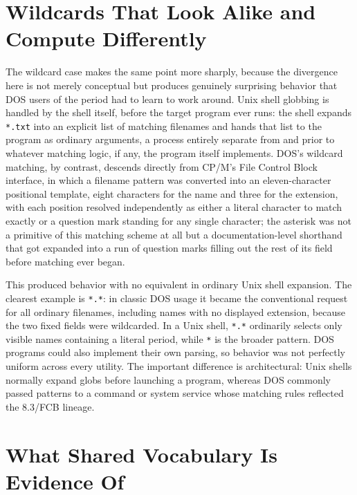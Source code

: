 \documentclass[11pt]{book}
\begin{document}
\section{Wildcards That Look Alike and Compute Differently}

The wildcard case makes the same point more sharply, because the divergence here is not merely conceptual but produces genuinely surprising behavior that DOS users of the period had to learn to work around. Unix shell globbing is handled by the shell itself, before the target program ever runs: the shell expands \texttt{*.txt} into an explicit list of matching filenames and hands that list to the program as ordinary arguments, a process entirely separate from and prior to whatever matching logic, if any, the program itself implements. DOS's wildcard matching, by contrast, descends directly from CP/M's File Control Block interface, in which a filename pattern was converted into an eleven-character positional template, eight characters for the name and three for the extension, with each position resolved independently as either a literal character to match exactly or a question mark standing for any single character; the asterisk was not a primitive of this matching scheme at all but a documentation-level shorthand that got expanded into a run of question marks filling out the rest of its field before matching ever began.

This produced behavior with no equivalent in ordinary Unix shell expansion. The clearest example is \texttt{*.*}: in classic DOS usage it became the conventional request for all ordinary filenames, including names with no displayed extension, because the two fixed fields were wildcarded. In a Unix shell, \texttt{*.*} ordinarily selects only visible names containing a literal period, while \texttt{*} is the broader pattern. DOS programs could also implement their own parsing, so behavior was not perfectly uniform across every utility. The important difference is architectural: Unix shells normally expand globs before launching a program, whereas DOS commonly passed patterns to a command or system service whose matching rules reflected the 8.3/FCB lineage.

\section{What Shared Vocabulary Is Evidence Of}
\end{document}

